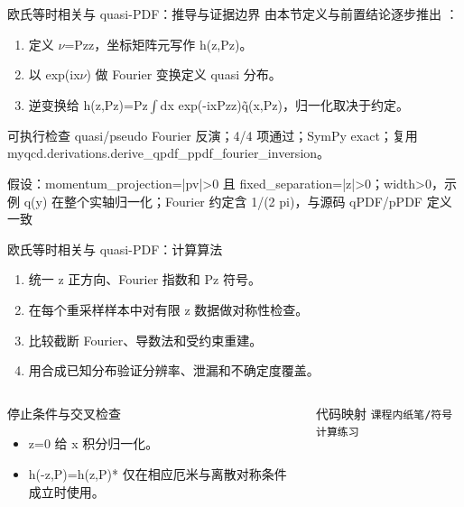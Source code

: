 \begin{frame}[t]{欧氏等时相关与 quasi-PDF：推导与证据边界}
\footnotesize
{}\quad 由本节定义与前置结论逐步推出 ：
\begin{enumerate}
\item 定义 \ensuremath{\nu}=Pzz，坐标矩阵元写作 h(z,Pz)。
\item 以 exp(ix\ensuremath{\nu}) 做 Fourier 变换定义 quasi 分布。
\item 逆变换给 h(z,Pz)=Pz\ensuremath{\int}dx exp(-ixPzz)q̃(x,Pz)，归一化取决于约定。
\end{enumerate}\begin{block}{可执行检查}
\quad quasi/\allowbreak{}pseudo Fourier 反演；4/4 项通过；SymPy exact；复用 myqcd.derivations.derive\_qpdf\_ppdf\_fourier\_inversion。
\par\scriptsize 假设：momentum\_projection=|pv|>0 且 fixed\_separation=|z|>0；width>0，示例 q(y) 在整个实轴归一化；Fourier 约定含 1/\allowbreak{}(2 pi)，与源码 qPDF/\allowbreak{}pPDF 定义一致
\end{block}
\end{frame}

\begin{frame}[t]{欧氏等时相关与 quasi-PDF：计算算法}
\footnotesize
{}\begin{enumerate}
\item 统一 z 正方向、Fourier 指数和 Pz 符号。
\item 在每个重采样样本中对有限 z 数据做对称性检查。
\item 比较截断 Fourier、导数法和受约束重建。
\item 用合成已知分布验证分辨率、泄漏和不确定度覆盖。
\end{enumerate}\begin{columns}[T,onlytextwidth]
\begin{block}{停止条件与交叉检查}\scriptsize\begin{itemize}
\item[\CheckMark] z=0 给 x 积分归一化。
\item[\CheckMark] h(-z,P)=h(z,P)* 仅在相应厄米与离散对称条件成立时使用。
\end{itemize}\end{block}
\begin{block}{代码映射}
\scriptsize \texttt{课程内纸笔/\allowbreak{}符号计算练习}
\end{block}\end{columns}\end{frame}

